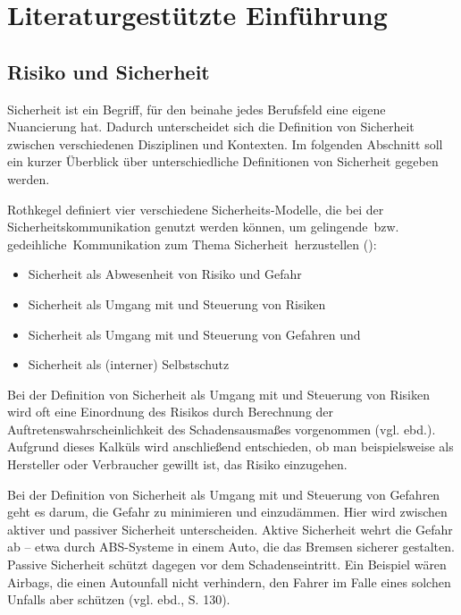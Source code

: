 \section{Literaturgestützte Einführung}

\subsection{Risiko und Sicherheit}
Sicherheit ist ein Begriff, für den beinahe jedes Berufsfeld eine eigene Nuancierung hat. Dadurch unterscheidet sich die Definition von Sicherheit zwischen verschiedenen Disziplinen und Kontexten. Im folgenden Abschnitt soll ein kurzer Überblick über unterschiedliche Definitionen von Sicherheit gegeben werden.


Rothkegel definiert vier verschiedene Sicherheits-Modelle, die bei der Sicherheitskommunikation genutzt werden können, um \glqq \glq gelingende\grq \, bzw. \glq gedeihliche\grq \, Kommunikation zum Thema Sicherheit\grqq \, herzustellen (\cite[125]{rothkegel2013sicherheitskommunikation}):
\begin{itemize}
  \item Sicherheit als Abwesenheit von Risiko und Gefahr
  \item Sicherheit als Umgang mit und Steuerung von Risiken
  \item Sicherheit als Umgang mit und Steuerung von Gefahren und
  \item Sicherheit als (interner) Selbstschutz
\end{itemize}

Bei der Definition von Sicherheit als Umgang mit und Steuerung von Risiken wird oft eine Einordnung des Risikos durch Berechnung der Auftretenswahrscheinlichkeit des Schadensausmaßes vorgenommen (vgl. ebd.). Aufgrund dieses Kalküls wird anschließend entschieden, ob man beispielsweise als Hersteller oder Verbraucher gewillt ist, das Risiko einzugehen.

Bei der Definition von Sicherheit als Umgang mit und Steuerung von Gefahren geht es darum, die Gefahr zu minimieren und einzudämmen. Hier wird zwischen aktiver und passiver Sicherheit unterscheiden. Aktive Sicherheit wehrt die Gefahr ab -- etwa durch ABS-Systeme in einem Auto, die das Bremsen sicherer gestalten. Passive Sicherheit schützt dagegen vor dem Schadenseintritt. Ein Beispiel wären Airbags, die einen Autounfall nicht verhindern, den Fahrer im Falle eines solchen Unfalls aber schützen (vgl. ebd., S. 130).

